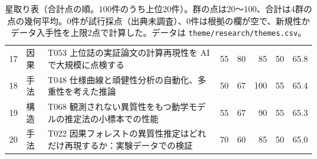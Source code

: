 \begin{table}[htbp]
\begin{tabularx}{\linewidth}{rlXrrrrr}
17 & 因果 & T053 上位誌の実証論文の計算再現性を AI で大規模に点検する & 55 & 80 & 85 & 50 & 65.8 \\
18 & 手法 & T048 仕様曲線と頑健性分析の自動化、多重性を考えた推論 & 50 & 67 & 100 & 55 & 65.4 \\
19 & 構造 & T068 観測されない異質性をもつ動学モデルの推定法の小標本での性能 & 55 & 67 & 90 & 55 & 65.3 \\
20 & 手法 & T022 因果フォレストの異質性推定はどれだけ再現するか：実験データでの検証 & 70 & 60 & 85 & 50 & 65.0 \\
\bottomrule
\end{tabularx}
\caption{星取り表（合計点の順。100件のうち上位20件）。群の点は20〜100、合計は4群の点の幾何平均。0件が試行採点（出典未調査）、0件は根拠の欄が空で、新規性かデータ入手性を上限2点で計算した。データは \texttt{theme/research/themes.csv}。}
\label{tab:th-hoshi}
\end{table}
